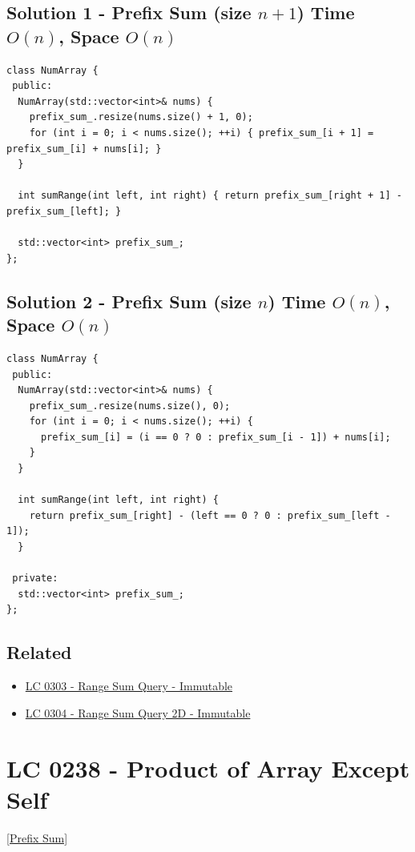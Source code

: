 \subsection*{Solution 1 - Prefix Sum (size $n + 1$) {\scriptsize\color{gray}\Coffeecup\hspace{1mm}Time $O(n)$, Space $O(n)$}}
\begin{lstlisting}
class NumArray {
 public:
  NumArray(std::vector<int>& nums) {
    prefix_sum_.resize(nums.size() + 1, 0);
    for (int i = 0; i < nums.size(); ++i) { prefix_sum_[i + 1] = prefix_sum_[i] + nums[i]; }
  }

  int sumRange(int left, int right) { return prefix_sum_[right + 1] - prefix_sum_[left]; }

  std::vector<int> prefix_sum_;
};
\end{lstlisting}

\subsection*{Solution 2 - Prefix Sum (size $n$) {\scriptsize\color{gray}\Coffeecup\hspace{1mm}Time $O(n)$, Space $O(n)$}}
\begin{lstlisting}
class NumArray {
 public:
  NumArray(std::vector<int>& nums) {
    prefix_sum_.resize(nums.size(), 0);
    for (int i = 0; i < nums.size(); ++i) {
      prefix_sum_[i] = (i == 0 ? 0 : prefix_sum_[i - 1]) + nums[i];
    }
  }

  int sumRange(int left, int right) {
    return prefix_sum_[right] - (left == 0 ? 0 : prefix_sum_[left - 1]);
  }

 private:
  std::vector<int> prefix_sum_;
};
\end{lstlisting}

\subsection*{Related}
\begin{itemize}
\item \hyperref[lc0303]{LC 0303 - Range Sum Query - Immutable}
\item \hyperref[lc0304]{LC 0304 - Range Sum Query 2D - Immutable}
\end{itemize}

\section{LC 0238 - Product of Array Except Self}\label{lc0238}
\hyperref[sec:prefix_sum]{[Prefix Sum]}\\

